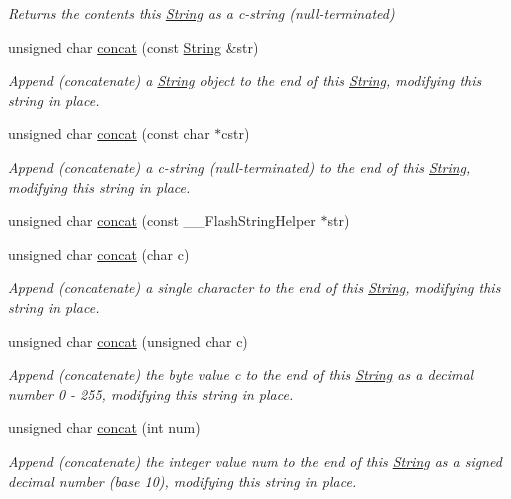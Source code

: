 \begin{DoxyCompactItemize}
\begin{DoxyCompactList}\small\item\em Returns the contents this \hyperlink{class_string}{String} as a c-\/string (null-\/terminated) \end{DoxyCompactList}\item 
unsigned char \hyperlink{class_string_a63f64f8a3da37d4570ce7b2ceec5bd2b}{concat} (const \hyperlink{class_string}{String} \&str)
\begin{DoxyCompactList}\small\item\em Append (concatenate) a \hyperlink{class_string}{String} object to the end of this \hyperlink{class_string}{String}, modifying this string in place. \end{DoxyCompactList}\item 
unsigned char \hyperlink{class_string_a5477edc378d55f57bb6572217e562c7a}{concat} (const char $\ast$cstr)
\begin{DoxyCompactList}\small\item\em Append (concatenate) a c-\/string (null-\/terminated) to the end of this \hyperlink{class_string}{String}, modifying this string in place. \end{DoxyCompactList}\item 
unsigned char \hyperlink{class_string_a09dd174078f7d0b1552b249949cfd96c}{concat} (const \+\_\+\+\_\+\+Flash\+String\+Helper $\ast$str)
\item 
unsigned char \hyperlink{class_string_a5f3e286a1a7b65a154e3e3dd19d4b707}{concat} (char c)
\begin{DoxyCompactList}\small\item\em Append (concatenate) a single character to the end of this \hyperlink{class_string}{String}, modifying this string in place. \end{DoxyCompactList}\item 
unsigned char \hyperlink{class_string_a1c02b2de34a3245d16c5430951789f7d}{concat} (unsigned char c)
\begin{DoxyCompactList}\small\item\em Append (concatenate) the byte value c to the end of this \hyperlink{class_string}{String} as a decimal number 0 -\/ 255, modifying this string in place. \end{DoxyCompactList}\item 
unsigned char \hyperlink{class_string_a6d437a7312b591848b5457705fee5549}{concat} (int num)
\begin{DoxyCompactList}\small\item\em Append (concatenate) the integer value num to the end of this \hyperlink{class_string}{String} as a signed decimal number (base 10), modifying this string in place. \end{DoxyCompactList}\item 

\end{DoxyCompactItemize}
